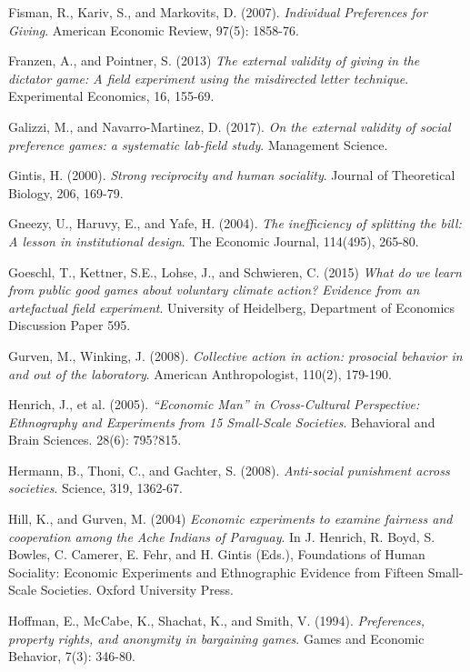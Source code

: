 \documentclass[12pt]{article}
\begin{document}
\begin{thebibliography}{9}
Fisman, R., Kariv, S., and Markovits, D. (2007).
\textit{Individual Preferences for Giving}.
American Economic Review, 97(5): 1858-76.

Franzen, A., and Pointner, S. (2013)
\textit{The external validity of giving in the dictator game: A field experiment using the misdirected letter technique}.
Experimental Economics, 16, 155-69.

Galizzi, M., and Navarro-Martinez, D. (2017).
\textit{On the external validity of social preference games: a systematic lab-field study}.
Management Science.

Gintis, H. (2000).
\textit{Strong reciprocity and human sociality}.
Journal of Theoretical Biology, 206, 169-79.

Gneezy, U., Haruvy, E., and Yafe, H. (2004).
\textit{The inefficiency of splitting the bill: A lesson in institutional design}.
The Economic Journal, 114(495), 265-80.

Goeschl, T., Kettner, S.E., Lohse, J., and Schwieren, C. (2015)
\textit{What do we learn from public good games about voluntary climate action? Evidence from an artefactual field experiment}.
University of Heidelberg, Department of Economics Discussion Paper 595.

Gurven, M., Winking, J. (2008).
\textit{Collective action in action: prosocial behavior in and out of the laboratory}.
American Anthropologist, 110(2), 179-190. 


Henrich, J., et al. (2005).
\textit{``Economic Man'' in Cross-Cultural Perspective: Ethnography and Experiments from 15 Small-Scale Societies}.
Behavioral and Brain Sciences. 28(6): 795?815.

Hermann, B., Thoni, C., and Gachter, S. (2008).
\textit{Anti-social punishment across societies}.
Science, 319, 1362-67.

Hill, K., and Gurven, M. (2004)
\textit{Economic experiments to examine fairness and cooperation among the Ache Indians of Paraguay}.
In J. Henrich, R. Boyd, S. Bowles, C. Camerer, E. Fehr, and H. Gintis (Eds.),
Foundations of Human Sociality: Economic Experiments and Ethnographic Evidence from Fifteen Small-Scale Societies. Oxford University Press.

Hoffman, E., McCabe, K., Shachat, K., and Smith, V. (1994).
\textit{Preferences, property rights, and anonymity in bargaining games}.
Games and Economic Behavior, 7(3): 346-80.


\end{thebibliography}
\end{document}
